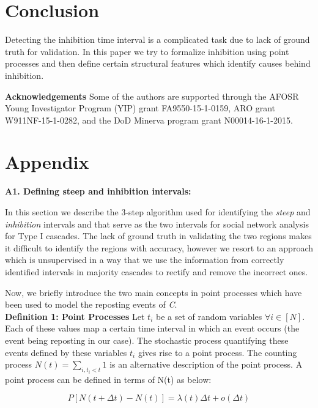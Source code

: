 \documentclass[smallextended]{svjour3}       %
\theoremstyle{definition}
\begin{document}
\section{Conclusion}
Detecting the inhibition time interval is a complicated task due to lack of ground truth for validation. In this paper we try to formalize inhibition using point processes and then define certain structural features which identify causes behind inhibition. 

\noindent \textbf{Acknowledgements} Some of the authors are supported through the AFOSR Young Investigator Program (YIP) grant FA9550-15-1-0159, ARO grant W911NF-15-1-0282, and the DoD Minerva program grant N00014-16-1-2015.



\section*{Appendix}


\textbf{A1. Defining steep and inhibition intervals:}

In this section we describe the 3-step algorithm used for identifying the \textit{steep} and \textit{inhibition} intervals and that serve as the two intervals for social network analysis for Type I cascades. The lack of ground truth in validating the two regions makes it difficult to identify the regions with accuracy, however we resort to an approach which is unsupervised in a way that we use the information from correctly identified intervals in majority cascades to rectify and remove the incorrect ones.

Now, we briefly introduce the two main concepts in point processes which have been used to model the reposting events of \textit{C}.
\\

\textbf{Definition 1: Point Processes} Let $t_i$ be a set of random variables 
$\forall i \in [N] $. Each of these values map a certain time interval in which an event occurs (the event being reposting in our case). The stochastic process quantifying these events defined by these variables $t_i $ gives rise to a point process.  The counting process $N(t) = \sum_{i, t_i < t} 1 $ is an alternative description of the point process. A point process can be defined in terms of N(t) as below:

\begin{equation}\label{eq:hawkes_prob}
P[N(t+\Delta t) - N(t)] = \lambda(t)\Delta t + o(\Delta t)
\end{equation}
\end{document}

